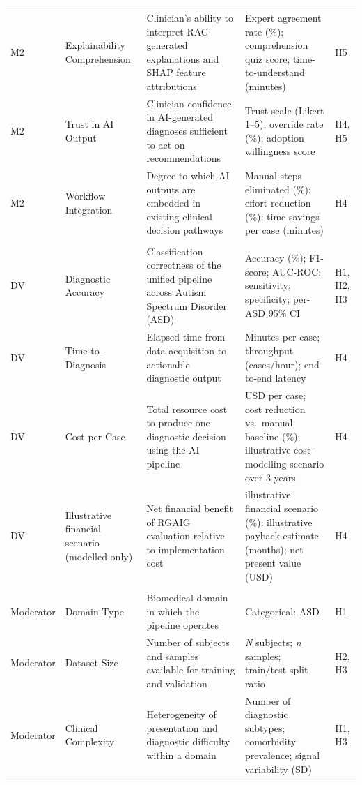 {\begin{xltabular}{\textwidth}{@{} >{\raggedright\arraybackslash}p{1.0cm} >{\raggedright\arraybackslash}p{2.5cm} p{4.9cm} p{4.6cm} >{\raggedright\arraybackslash}p{1.0cm} @{}}
\midrule
{} \\
\addlinespace
M2 & Explainability Comprehension & Clinician's ability to interpret RAG-generated explanations and SHAP feature attributions & Expert agreement rate (\%); comprehension quiz score; time-to-understand (minutes) & H5 \\
\addlinespace
M2 & Trust in AI Output & Clinician confidence in AI-generated diagnoses sufficient to act on recommendations & Trust scale (Likert 1--5); override rate (\%); adoption willingness score & H4, H5 \\
\addlinespace
M2 & Workflow Integration & Degree to which AI outputs are embedded in existing clinical decision pathways & Manual steps eliminated (\%); effort reduction (\%); time savings per case (minutes) & H4 \\
\midrule
{} \\
\addlinespace
DV & Diagnostic Accuracy & Classification correctness of the unified pipeline across Autism Spectrum Disorder (ASD) & Accuracy (\%); F1-score; AUC-ROC; sensitivity; specificity; per-ASD 95\% CI & H1, H2, H3 \\
\addlinespace
DV & Time-to-Diagnosis & Elapsed time from data acquisition to actionable diagnostic output & Minutes per case; throughput (cases/hour); end-to-end latency & H4 \\
\addlinespace
DV & Cost-per-Case & Total resource cost to produce one diagnostic decision using the AI pipeline & USD per case; cost reduction vs.\ manual baseline (\%); illustrative cost-modelling scenario over 3 years & H4 \\
\addlinespace
DV & Illustrative financial scenario (modelled only) & Net financial benefit of RGAIG evaluation relative to implementation cost & illustrative financial scenario (\%); illustrative payback estimate (months); net present value (USD) & H4 \\
\midrule
{} \\
\addlinespace
Moderator & Domain Type & Biomedical domain in which the pipeline operates & Categorical: ASD & H1 \\
\addlinespace
Moderator & Dataset Size & Number of subjects and samples available for training and validation & \textit{N} subjects; \textit{n} samples; train/test split ratio & H2, H3 \\
\addlinespace
Moderator & Clinical Complexity & Heterogeneity of presentation and diagnostic difficulty within a domain & Number of diagnostic subtypes; comorbidity prevalence; signal variability (SD) & H1, H3 \\

\end{xltabular}}
